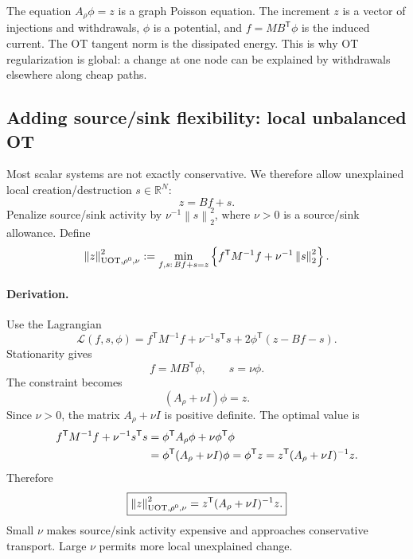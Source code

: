\documentclass[11pt]{article}
\numberwithin{equation}{section}
\newcommand{\R}{\mathbb{R}}
\newcommand{\transpose}{^{\mathsf T}}
\newcommand{\norm}[1]{\left\lVert #1\right\rVert}
\begin{document}
\begin{heuristicbox}
The equation $A_\rho\phi=z$ is a graph Poisson equation.  The increment $z$ is a vector of injections and withdrawals, $\phi$ is a potential, and $f=MB\transpose\phi$ is the induced current.  The OT tangent norm is the dissipated energy.  This is why OT regularization is global: a change at one node can be explained by withdrawals elsewhere along cheap paths.
\end{heuristicbox}

\subsection{Adding source/sink flexibility: local unbalanced OT}
\label{subsec:unbalanced-tangent}

Most scalar systems are not exactly conservative.  We therefore allow unexplained local creation/destruction $s\in\R^N$:
\begin{equation}
  z=Bf+s.
  \label{eq:z-Bf-s}
\end{equation}
Penalize source/sink activity by $\nu^{-1}\norm{s}_2^2$, where $\nu>0$ is a source/sink allowance.  Define
\begin{equation}
  \norm{z}_{\rm UOT,\rho^0,\nu}^2
  :=\min_{f,s:\,Bf+s=z}\left\{
  f\transpose M^{-1}f+\nu^{-1}\norm{s}_2^2
  \right\}.
  \label{eq:uot-primal}
\end{equation}

\paragraph{Derivation.}
Use the Lagrangian
\begin{equation}
  \mathcal L(f,s,\phi)
  =f\transpose M^{-1}f+\nu^{-1}s\transpose s
   +2\phi\transpose(z-Bf-s).
  \label{eq:uot-lagrangian}
\end{equation}
Stationarity gives
\begin{equation}
  f=MB\transpose\phi,
  \qquad
  s=\nu\phi.
  \label{eq:uot-stationarity}
\end{equation}
The constraint becomes
\begin{equation}
  (A_\rho+\nu I)\phi=z.
  \label{eq:uot-poisson}
\end{equation}
Since $\nu>0$, the matrix $A_\rho+\nu I$ is positive definite.  The optimal value is
\begin{align}
  f\transpose M^{-1}f+\nu^{-1}s\transpose s
  &=\phi\transpose A_\rho\phi+\nu\phi\transpose\phi\notag\\
  &=\phi\transpose(A_\rho+\nu I)\phi
  =\phi\transpose z
  =z\transpose(A_\rho+\nu I)^{-1}z.
  \label{eq:uot-value}
\end{align}
Therefore
\begin{equation}
  \boxed{\norm{z}_{\rm UOT,\rho^0,\nu}^2
  =z\transpose(A_\rho+\nu I)^{-1}z.}
  \label{eq:uot-boxed}
\end{equation}
Small $\nu$ makes source/sink activity expensive and approaches conservative transport.  Large $\nu$ permits more local unexplained change.
\end{document}
